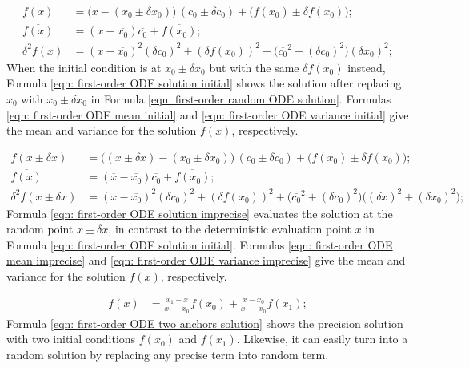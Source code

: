 \documentclass[twoside]{article}
\numberwithin{equation}{section}
\begin{document}
\begin{align}
\label{eqn: first-order ODE solution initial}
f(x) &= \big(x - (x_0 \pm \delta x_0)\big)\,(c_0 \pm \delta c_0) + \big(f(x_0) \pm \delta f(x_0)\big); \\
\label{eqn: first-order ODE mean initial}
\overline{f(x)} &= (x - \overline{x_0}) \overline{c_0} + \overline{f(x_0)}; \\
\label{eqn: first-order ODE variance initial}
\delta^2 f(x) &= (x - \overline{x_0})^2 (\delta c_0)^2 + (\delta f(x_0))^2 + \big(\overline{c_0}^2+(\delta c_0)^2\big)(\delta x_0)^2;
\end{align}
When the initial condition is at $x_0 \pm \delta x_0$ but with the same $\delta f(x_0)$ instead, Formula \eqref{eqn: first-order ODE solution initial} shows the solution after replacing $x_0$ with $x_0 \pm \delta x_0$ in Formula \eqref{eqn: first-order random ODE solution}.
Formulas \eqref{eqn: first-order ODE mean initial} and \eqref{eqn: first-order ODE variance initial} give the mean and variance for the solution $f(x)$, respectively.

\begin{align}
\label{eqn: first-order ODE solution imprecise}
f(x \pm \delta x) &= \big((x \pm \delta x) - (x_0 \pm \delta x_0)\big)\,(c_0 \pm \delta c_0) + \big(f(x_0) \pm \delta f(x_0)\big); \\
\label{eqn: first-order ODE mean imprecise}
\overline{f(x)} &= (\overline{x} - \overline{x_0}) \overline{c_0} + \overline{f(x_0)}; \\
\label{eqn: first-order ODE variance imprecise}
\delta^2 f(x \pm \delta x) &= (x - \overline{x_0})^2 (\delta c_0)^2 + (\delta f(x_0))^2
		 + \big(\overline{c_0}^2+(\delta c_0)^2\big) \big((\delta x)^2+(\delta x_0)^2 \big);
\end{align}
Formula \eqref{eqn: first-order ODE solution imprecise} evaluates the solution at the random point $x \pm \delta x$, in contrast to the deterministic evaluation point $x$ in Formula \eqref{eqn: first-order ODE solution initial}. 
Formulas \eqref{eqn: first-order ODE mean imprecise} and \eqref{eqn: first-order ODE variance imprecise} give the mean and variance for the solution $f(x)$, respectively.

\begin{align}
\label{eqn: first-order ODE two anchors solution}
f(x) &= \frac{x_1 - x}{x_1 - x_0} f(x_0) + \frac{x - x_0}{x_1 - x_0} f(x_1); 
\end{align}
Formula \eqref{eqn: first-order ODE two anchors solution} shows the precision solution with two initial conditions $f(x_0)$ and $f(x_1)$.
Likewise, it can easily turn into a random solution by replacing any precise term into random term.
\end{document}
